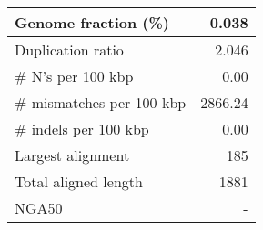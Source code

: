 \documentclass[12pt,a4paper]{article}
\begin{document}
\begin{table}[ht]
\begin{center}
\begin{tabular}{|l*{1}{|r}|}
Genome fraction (\%) & 0.038 \\ \hline
Duplication ratio & 2.046 \\ \hline
\# N's per 100 kbp & 0.00 \\ \hline
\# mismatches per 100 kbp & 2866.24 \\ \hline
\# indels per 100 kbp & 0.00 \\ \hline
Largest alignment & 185 \\ \hline
Total aligned length & 1881 \\ \hline
NGA50 & - \\ \hline
\end{tabular}
\end{center}
\end{table}
\end{document}

